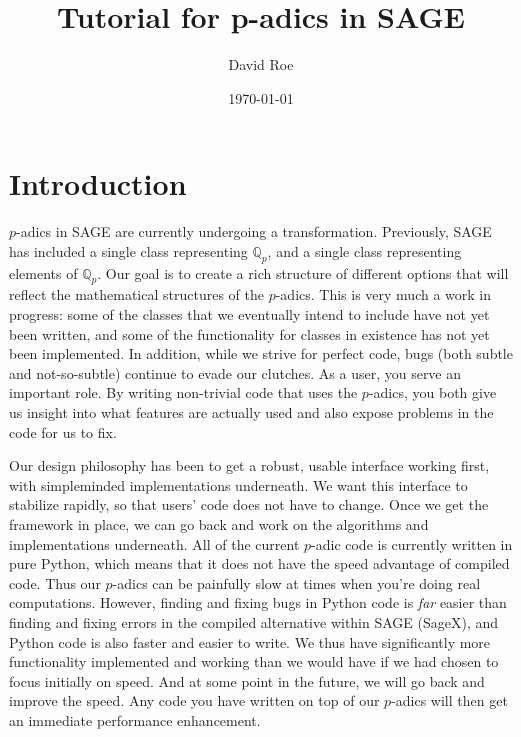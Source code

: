 \documentclass[12pt]{article}
\title{Tutorial for p-adics in SAGE}
\author{David Roe}
\date{\today}
\begin{document}
\def\ZZ{\mathbb{Z}}
\def\QQ{\mathbb{Q}}
\def\Qp{\mathbb{Q}_p}
\def\Zp{\mathbb{Z}_p}
\def\Zpx{\mathbb{Z}_p^{\times}}
\def\Zpn{\mathbb{Z} / p^n\mathbb{Z}}
\def\OK{\mathcal{O}_K}

\maketitle

\section{Introduction}

$p$-adics in SAGE are currently undergoing a transformation.
Previously, SAGE has included a single class representing $\Qp$,
and a single class representing elements of $\Qp$.
Our goal is to create a rich structure of different options
that will reflect the mathematical structures of the $p$-adics.
This is very much a work in progress: some of the classes
that we eventually intend to include have not yet been written,
and some of the functionality for classes in existence has not yet been implemented.
In addition, while we strive for perfect code,
bugs (both subtle and not-so-subtle) continue to evade our clutches.
As a user, you serve an important role.
By writing non-trivial code that uses the $p$-adics,
you both give us insight into what features are actually used
and also expose problems in the code for us to fix.

Our design philosophy has been to get a robust,
usable interface working first,
with simpleminded implementations underneath.
We want this interface to stabilize rapidly,
so that users' code does not have to change.
Once we get the framework in place,
we can go back and work on the algorithms and implementations underneath.
All of the current $p$-adic code is currently written in pure Python,
which means that it does not have the speed advantage of compiled code.
Thus our $p$-adics can be painfully slow at times when you're doing real computations.
However, finding and fixing bugs in Python code is \emph{far} easier
than finding and fixing errors in the compiled alternative within SAGE (SageX),
and Python code is also faster and easier to write.
We thus have significantly more functionality implemented and working
than we would have if we had chosen to focus initially on speed.
And at some point in the future, we will go back and improve the speed.
Any code you have written on top of our $p$-adics will then
get an immediate performance enhancement.
\end{document}
